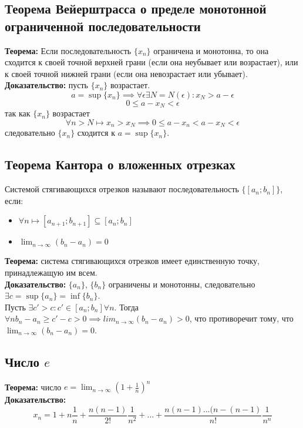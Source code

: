 \documentclass{article}
\begin{document}
    \subsection*{Теорема  Вейерштрасса  о  пределе  монотонной  ограниченной  последовательности}
        \textbf{Теорема:} Если последовательность $\{x_n\}$ ограничена и монотонна, то она сходится к своей точной верхней грани (если она неубывает или возрастает),
        или к своей точной нижней грани (если она невозрастает или убывает).
        \\
        \textbf{Доказательство:}
        пусть $\{x_n\}$ возрастает. 
        \[ a = \sup \{x_n\} \implies \forall \epsilon \exists N = N(\epsilon): x_{N} > a - \epsilon \]
        \[ 0 \le a - x_{N} < \epsilon \]
        так как $\{x_n\}$ возрастает
        \[ \forall n > N \longmapsto x_n > x_N \implies 0 \le a - x_{n} < a - x_{N} < \epsilon \]
        следовательно $\{x_n\}$ сходится к $a = \sup \{x_n\}$.
        
        
    \subsection*{Теорема Кантора о вложенных отрезках}
        Системой стягивающихся отрезков называют последовательность $\{[a_n;b_n]\}$, если:
        \begin{itemize}
            \item $\forall n \longmapsto [a_{n+1};b_{n+1}] \subseteq [a_{n};b_{n}]$
            \item $\lim_{n\to\infty} (b_n - a_n) = 0$
        \end{itemize}
        \textbf{Теорема:} система стягивающихся отрезков имеет единственную точку, принадлежащую им всем.
        \\
        \textbf{Доказательство:}
        $\{a_n\}$, $\{b_n\}$ ограничены и монотонны, следовательно $\exists c = \sup \{a_n\} = \inf \{b_n\}$.
        \\
        Пусть $\exists c' > c: c' \in [a_n; b_n] \forall n$. Тогда $\forall n b_n - a_n \ge c' - c > 0 \implies lim_{n\to\infty} (b_n - a_n) > 0$,
        что противоречит тому, что $\lim_{n\to\infty} (b_n - a_n) = 0$.
        
        
    \subsection*{Число $e$}
        \textbf{Теорема:} число $e = \lim_{n\to\infty} \left(1 + \frac{1}{n} \right)^n$
        \\
        \textbf{Доказательство:}
        \[ x_n = 1 + n\frac{1}{n} + \frac{n(n-1)}{2!}\frac{1}{n^2} + ... +
        \frac{n(n-1)...(n - (n - 1)}{n!}\frac{1}{n^n} \]
        
\end{document}
